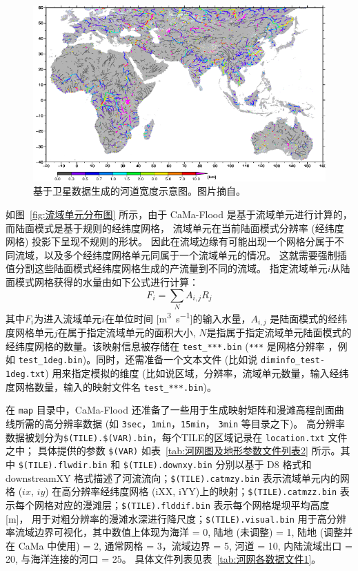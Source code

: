 {
\begin{figure}[htbp]
\centering
\includegraphics{Figures/陆地表面的水分循环/基于卫星数据生成的河道宽度示意图.png}
\caption{基于卫星数据生成的河道宽度示意图。图片摘自\citet{yamazaki2011physically}。}
\label{fig:基于卫星数据生成的河道宽度示意图}
\end{figure}
}

如图~\ref{fig:流域单元分布图} 所示，由于 CaMa-Flood 是基于流域单元进行计算的，而陆面模式是基于规则的经纬度网格，
流域单元在当前陆面模式分辨率 (经纬度网格) 投影下呈现不规则的形状。
因此在流域边缘有可能出现一个网格分属于不同流域，以及多个经纬度网格单元同属于一个流域单元的情况。
这就需要强制插值分割这些陆面模式经纬度网格生成的产流量到不同的流域。
指定流域单元$i$从陆面模式网格获得的水量由如下公式进行计算：
\begin{equation}
F_{i}=\sum_{N} A_{i, j} R_{j}
\end{equation}
其中$F_i$为进入流域单元$i$在单位时间 [\unit{m^3.s^{-1}}]的输入水量，$A_{i, j}$ 是陆面模式的经纬度网格单元$j$在属于指定流域单元的面积大小,
 $N$是指属于指定流域单元陆面模式的经纬度网格的数量。该映射信息被存储在 \texttt{test\_***.bin} (\texttt{***} 是网格分辨率
 ，例如 \texttt{test\_1deg.bin})。同时，还需准备一个文本文件 (比如说 \texttt{diminfo\_test-1deg.txt}) 用来指定模拟的维度
  (比如说区域，分辨率，流域单元数量，输入经纬度网格数量，输入的映射文件名 \texttt{test\_***.bin})。

在 \texttt{map} 目录中，CaMa-Flood 还准备了一些用于生成映射矩阵和漫滩高程剖面曲线所需的高分辨率数据 (如 \texttt{3sec}，\texttt{1min}，\texttt{15min}，
\texttt{3min} 等目录之下)。
高分辨率数据被划分为\texttt{\$(TILE).\$(VAR).bin}，每个TILE的区域记录在 \texttt{location.txt} 文件之中；
具体提供的参数 \texttt{\$(VAR)} 如表~\ref{tab:河网图及地形参数文件列表2} 所示。其中 \texttt{\$(TILE).flwdir.bin} 和
\texttt{\$(TILE).downxy.bin} 分别以基于 D8 格式和 downstreamXY 格式描述了河流流向；\texttt{\$(TILE).catmzy.bin} 表示流域单元内的网格 ($ix$, $iy$) 
在高分辨率经纬度网格 (iXX, iYY)上的映射；\texttt{\$(TILE).catmzz.bin} 表示每个网格对应的漫滩层；\texttt{\$(TILE).flddif.bin} 表示每个网格堤坝平均高度 [m]，
用于对粗分辨率的漫滩水深进行降尺度；\texttt{\$(TILE).visual.bin} 用于高分辨率流域边界可视化，其中数值上体现为海洋 = 0, 
陆地 (未调整) = 1, 陆地 (调整并在 CaMa 中使用) = 2, 通常网格 = 3，流域边界 = 5, 河道 = 10, 内陆流域出口 = 20, 与海洋连接的河口 = 25。
具体文件列表见表~\ref{tab:河网各数据文件1}。

